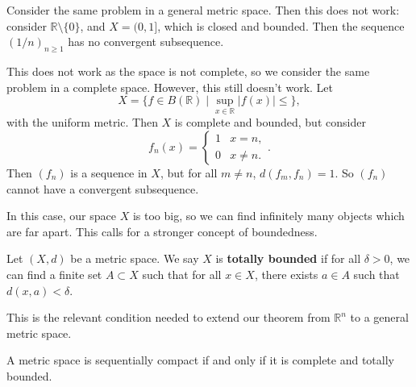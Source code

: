\documentclass[12pt]{article}
\begin{document}
Consider the same problem in a general metric space. Then this does not work: consider $\mathbb{R} \setminus \{0\}$, and $X = (0, 1]$, which is closed and bounded. Then the sequence $(1/n)_{n\geq 1}$ has no convergent subsequence.

This does not work as the space is not complete, so we consider the same problem in a complete space. However, this still doesn't work. Let
\[
	X = \{f \in B(\mathbb{R}) \mid \sup_{x \in \mathbb{R}}|f(x)| \leq \}
,\]
with the uniform metric. Then $X$ is complete and bounded, but consider
\[
	f_n(x) =
	\begin{cases}
		1 & x = n, \\
		0 & x \neq n.
	\end{cases}
.\]
Then $(f_n)$ is a sequence in $X$, but for all $m \neq n$, $d(f_m, f_n) = 1$. So $(f_n)$ cannot have a convergent subsequence.

In this case, our space $X$ is too big, so we can find infinitely many objects which are far apart. This calls for a stronger concept of boundedness.

\begin{definition}
	Let $(X, d)$ be a metric space. We say $X$ is \textbf{totally bounded} if for all $\delta > 0$, we can find a finite set $A \subset X$ such that for all $x \in X$, there exists $a \in A$ such that $d(x, a) < \delta$.
\end{definition}

This is the relevant condition needed to extend our theorem from $\mathbb{R}^{n}$ to a general metric space.

\begin{theorem}
	A metric space is sequentially compact if and only if it is complete and totally bounded.
\end{theorem}
\end{document}
